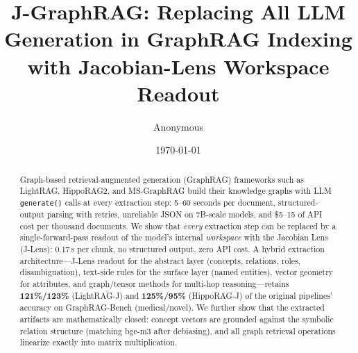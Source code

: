 \documentclass[11pt]{article}
\title{J-GraphRAG: Replacing All LLM Generation in GraphRAG Indexing\\
with Jacobian-Lens Workspace Readout}
\author{Anonymous}
\date{\today}
\begin{document}
\maketitle

\begin{abstract}
Graph-based retrieval-augmented generation (GraphRAG) frameworks such as
LightRAG, HippoRAG2, and MS-GraphRAG build their knowledge graphs with LLM
\texttt{generate()} calls at every extraction step: 5--60 seconds per document,
structured-output parsing with retries, unreliable JSON on 7B-scale models, and
\$5--15 of API cost per thousand documents. We show that \emph{every} extraction
step can be replaced by a single-forward-pass readout of the model's internal
\emph{workspace} with the Jacobian Lens (J-Lens): 0.17\,s per chunk, no
structured output, zero API cost. A hybrid extraction architecture---J-Lens
readout for the abstract layer (concepts, relations, roles, disambiguation),
text-side rules for the surface layer (named entities), vector geometry for
attributes, and graph/tensor methods for multi-hop reasoning---retains
\textbf{121\%/123\%} (LightRAG-J) and \textbf{125\%/95\%} (HippoRAG-J) of the
original pipelines' accuracy on GraphRAG-Bench (medical/novel). We further show
that the extracted artifacts are mathematically closed: concept vectors are
grounded against the symbolic relation structure (matching bge-m3 after
debiasing), and all graph retrieval operations linearize exactly into matrix
multiplication.
\end{abstract}











\appendix

\end{document}
